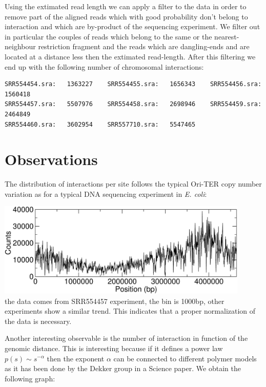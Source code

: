 \documentclass[12pt,a4paper,notitlepage]{article}
\newcommand{\ecoli}{\emph{E. coli}\xspace}
\begin{document}
Using the extimated read length we can apply a filter to the data in
order to remove part of the aligned reads which with good probability
don't belong to interaction and which are by-product of the sequencing
experiment. We filter out in particular the couples of reads which
belong to the same or the nearest-neighbour restriction fragment and
the reads which are dangling-ends and are located at a distance
less then the extimated read-length. After this filtering we
end up with the following number of chromosomal interactions:
\begin{verbatim}
SRR554454.sra:   1363227    SRR554455.sra:   1656343    SRR554456.sra:   1560418
SRR554457.sra:   5507976    SRR554458.sra:   2698946    SRR554459.sra:   2464849
SRR554460.sra:   3602954    SRR557710.sra:   5547465
\end{verbatim}

\section{Observations}
The distribution of interactions per site follows the typical Ori-TER copy
number variation as for a typical DNA sequencing experiment in \ecoli:

\vspace{.5cm}\hspace{2cm}\includegraphics[width=12cm]{SRR554457ongenome}\\
the data comes from SRR554457 experiment, the bin is 1000bp, other
experiments show a similar trend. This indicates that a proper
normalization of the data is necessary.

Another interesting observable is the number of interaction in
function of the genomic distance. This is interesting because if it
defines a power law $p(s) \sim s^{-\alpha}$ then the exponent $\alpha$
can be connected to different polymer models as it has been done by
the Dekker group in a Science paper\cite{Lieberman2009}. We obtain the
following graph:
\end{document}
